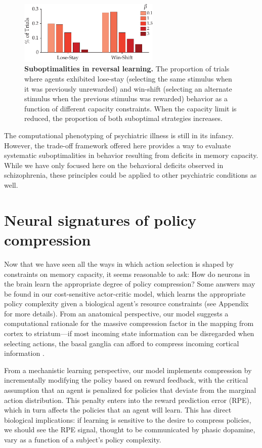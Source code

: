 \documentclass[11pt]{article}
\begin{document}
\begin{figure}
    \centering
    \includegraphics[width=0.6\textwidth]{figs/revsz.pdf}
            \caption{\textbf{Suboptimalities in reversal learning.} The proportion of trials where agents exhibited lose-stay (selecting the same stimulus when it was previously unrewarded) and win-shift (selecting an alternate stimulus when the previous stimulus was rewarded) behavior as a function of different capacity constraints. When the capacity limit is reduced, the proportion of both suboptimal strategies increases.}
    \label{fig:revsz}
\end{figure}

The computational phenotyping of psychiatric illness is still in its infancy. However, the trade-off framework offered here provides a way to evaluate systematic suboptimalities in behavior resulting from deficits in memory capacity. While we have only focused here on the behavioral deficits observed in schizophrenia, these principles could be applied to other psychiatric conditions as well.


\section{Neural signatures of policy compression}

Now that we have seen all the ways in which action selection is shaped by constraints on memory capacity, it seems reasonable to ask: How do neurons in the brain learn the appropriate degree of policy compression? Some answers may be found in our cost-sensitive actor-critic model, which learns the appropriate policy complexity given a biological agent's resource constraints (see Appendix for more details). From an anatomical perspective, our model suggests a computational rationale for the massive compression factor in the mapping from cortex to striatum---if most incoming state information can be disregarded when selecting actions, the basal ganglia can afford to compress incoming cortical information \citep{Bar-Gad2003-fn}. 

From a mechanistic learning perspective, our model implements compression by incrementally modifying the policy based on reward feedback, with the critical assumption that an agent is penalized for policies that deviate from the marginal action distribution. This penalty enters into the reward prediction error (RPE), which in turn affects the policies that an agent will learn. This has direct biological implications: if learning is sensitive to the desire to compress policies, we should see the RPE signal, thought to be communicated by phasic dopamine, vary as a function of a subject's policy complexity. 
\end{document}
